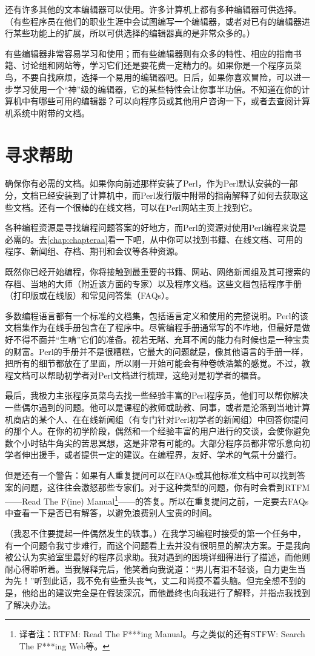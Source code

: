还有许多其他的文本编辑器可以使用。许多计算机上都有多种编辑器可供选择。（有些程序员在他们的职业生涯中会试图编写一个编辑器，或者对已有的编辑器进行某些功能上的扩展，所以可供选择的编辑器真的是非常众多的。）

有些编辑器非常容易学习和使用；而有些编辑器则有众多的特性、相应的指南书籍、讨论组和网站等，学习它们还是要花费一定精力的。如果你是一个程序员菜鸟，不要自找麻烦，选择一个易用的编辑器吧。日后，如果你喜欢冒险，可以进一步学习使用一个“神”级的编辑器，它的某些特性会让你事半功倍。不知道在你的计算机中有哪些可用的编辑器？可以向程序员或其他用户咨询一下，或者去查阅计算机系统中附带的文档。

\section{寻求帮助}
确保你有必需的文档。如果你向前述那样安装了Perl，作为Perl默认安装的一部分，文档已经安装到了计算机中，而Perl发行版中附带的指南解释了如何去获取这些文档。还有一个很棒的在线文档，可以在Perl网站主页上找到它。

各种编程资源是寻找编程问题答案的好地方，而Perl的资源对使用Perl编程来说是必需的。去\autoref{chap:chapteraa}看一下吧，从中你可以找到书籍、在线文档、可用的程序、新闻组、存档、期刊和会议等各种资源。

既然你已经开始编程，你将接触到最重要的书籍、网站、网络新闻组及其可搜索的存档、当地的大师（附近该方面的专家）以及程序文档。这些文档包括程序手册（打印版或在线版）和常见问答集（FAQs）。

多数编程语言都有一个标准的文档集，包括语言定义和使用的完整说明。Perl的该文档集作为在线手册包含在了程序中。尽管编程手册通常写的不咋地，但最好是做好不得不面并“生啃”它们的准备。视若无睹、充耳不闻的能力有时候也是一种宝贵的财富。Perl的手册并不是很糟糕，它最大的问题就是，像其他语言的手册一样，把所有的细节都放在了里面，所以刚一开始可能会有种卷帙浩繁的感觉。不过，教程文档可以帮助初学者对Perl文档进行梳理，这绝对是初学者的福音。

最后，我极力主张程序员菜鸟去找一些经验丰富的Perl程序员，他们可以帮你解决一些偶尔遇到的问题。他可以是课程的教师或助教、同事，或者是沦落到当地计算机商店的某个人、在在线新闻组（有专门针对Perl初学者的新闻组）中回答你提问的那个人。在你的初学阶段，偶然和一个经验丰富的用户进行的交谈，会使你避免数个小时钻牛角尖的苦思冥想，这是非常有可能的。大部分程序员都非常乐意向初学者伸出援手，或者提供一定的建议。在编程界，友好、学术的气氛十分盛行。

但是还有一个警告：如果有人重复提问可以在FAQs或其他标准文档中可以找到答案的问题，这往往会激怒那些专家们。对于这种类型的问题，你有时会看到RTFM——Read The F(ine) Manual\footnote{译者注：RTFM: Read The F***ing Manual。与之类似的还有STFW: Search The F***ing Web等。}——的答复。所以在重复提问之前，一定要去FAQs中查看一下是否已有解答，以避免浪费别人宝贵的时间。

（我忍不住要提起一件偶然发生的轶事。）在我学习编程时接受的第一个任务中，有一个问题令我寸步难行，而这个问题看上去并没有很明显的解决方案。于是我向被公认为实验室里最好的程序员求助。我对遇到的困境详细得进行了描述，而他则耐心得聆听着。当我解释完后，他笑着向我说道：“男儿有泪不轻谈，自力更生当为先！”听到此话，我不免有些垂头丧气，丈二和尚摸不着头脑。但完全想不到的是，他给出的建议完全是在假装深沉，而他最终也向我进行了解释，并指点我找到了解决办法。
